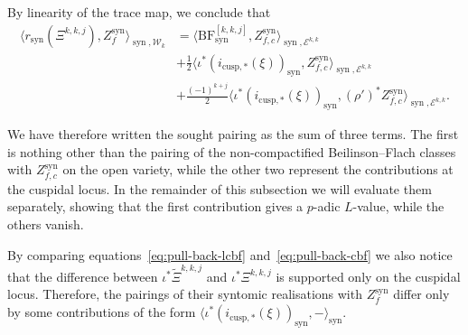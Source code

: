 \documentclass[10pt,a4paper]{amsart}
\newcommand{\BF}{\mathrm{BF}}
\newcommand{\Ell}{\mathcal{E}}
\newcommand{\KS}{\mathscr{W}}
\newcommand{\cBF}{\Xi}
\newcommand{\lcBF}{\widetilde{\Xi}}
\newcommand{\regulator}[1]{r_{#1}}
\newcommand{\rsyn}{\regulator{\syn}}
\DeclareMathOperator{\syn}{syn}
\begin{document}
By linearity of the trace map, we conclude that
\begin{equation}
    \label{eq:pairing-in-two}
    \begin{split}
        \langle \rsyn(\cBF^{k,k,j}),Z_f^{\syn} \rangle_{\syn, \KS_k} &= \langle \BF^{[k,k,j]}_{\syn}, Z_{f,c}^{\syn} \rangle_{\syn,\Ell^{k, k}} \\
        &+ \frac{1}{2}\langle \iota^*(i_{\mathrm{cusp},*}(\xi))_{\syn}, Z_{f,c}^{\syn} \rangle_{\syn,\Ell^{k, k}} \\
        &+ \frac{(-1)^{k+j}}{2}\langle \iota^*(i_{\mathrm{cusp},*}(\xi))_{\syn}, (\rho')^* Z_{f,c}^{\syn} \rangle_{\syn,\Ell^{k, k}}.
    \end{split}
\end{equation}

   We have therefore written the sought pairing as the sum of three terms. The first is nothing other than the pairing of the non-compactified Beilinson--Flach classes with $Z_{f,c}^{\syn}$ on the open variety, while the other two represent the contributions at the cuspidal locus. In the remainder of this subsection we will evaluate them separately, showing that the first contribution gives a $p$-adic $L$-value, while the others vanish.

   By comparing equations~\eqref{eq:pull-back-lcbf} and~\eqref{eq:pull-back-cbf} we also notice that the difference between $\iota^*\lcBF^{k,k,j}$ and $\iota^*\cBF^{k,k,j}$ is supported only on the cuspidal locus. Therefore, the pairings of their syntomic realisations with $Z_f^{\syn}$ differ only by some contributions of the form $\langle \iota^*(i_{\mathrm{cusp},*}(\xi ))_{\syn}, - \rangle_{\syn}$.
\end{document}
